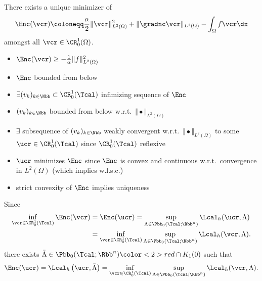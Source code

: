 \begin{frame}
  \begin{block}{}
    There exists a unique minimizer of 
    \begin{align*}
      \Enc(\vcr)\coloneqq \frac{\alpha}{2}\Vert \vcr\Vert_{L^2(\Omega)}^2
      +\Vert \gradnc\vcr\Vert_{L^1(\Omega)}
      -\int_\Omega f\vcr\dx
    \end{align*}
    amongst all $\vcr\in \CR^1_0(\Omega)$.
  \end{block}

  \pause
  \begin{itemize}[label=$\bullet$]
    \item $\Enc(\vcr) \geq -\frac{1}{\alpha}\Vert f\Vert_{L^2(\Omega)}^2$
      \pause
    \item $\Enc$ bounded from below
      \pause
    \item $\exists (v_k)_{k\in\Nbb} \subset \CR^1_0(\Tcal)$ infimizing sequence
      of $\Enc$
      \pause
    \item $(v_k)_{k\in\Nbb}$ bounded from below w.r.t.\
      $\Vert\bullet\Vert_{L^2(\Omega)}$
      \pause
    \item  $\exists$ subsequence of $(v_k)_{k\in\Nbb}$ weakly convergent 
      w.r.t.\ 
      $\Vert\bullet\Vert_{L^2(\Omega)}$
      to some $\ucr\in\CR^1_0(\Tcal)$ since $\CR^1_0(\Tcal)$ reflexive 
      \pause
    \item $\ucr$ minimizes $\Enc$ since $\Enc$ is convex and continuous w.r.t.\
      convergence in $L^2(\Omega)$ (which implies w.l.s.c.)
      \pause
    \item strict convexity of $\Enc$ implies uniqueness
  \end{itemize}
\end{frame}

\begin{frame}
  Since  
  \begin{align*}
    \inf_{\vcr\in\CR^1_0(\Tcal)}\Enc(\vcr)&=
    \Enc(\ucr) = \sup_{\Lambda\in\Pbb_0(\Tcal;\Rbb^n)}\Lcal_h(\ucr,\Lambda)\\
    &=\inf_{\vcr\in\CR^1_0(\Tcal)}\sup_{\Lambda\in\Pbb_0(\Tcal;\Rbb^n)} 
    \Lcal_h(\vcr,\Lambda).
  \end{align*}
  there exists 
  $\bar\Lambda\in\Pbb_0(\Tcal;\Rbb^n){\color<2>{red}\cap K_1(0)}$ such that
  \begin{align*}
    \Enc(\ucr)=
    \Lcal_h\left(\ucr,\bar\Lambda\right)=
    \inf_{\vcr\in\CR^1_0(\Tcal)}\sup_{\Lambda\in\Pbb_0(\Tcal;\Rbb^n)} 
    \Lcal_h(\vcr,\Lambda).
  \end{align*}
  
  \pause
\end{frame}

